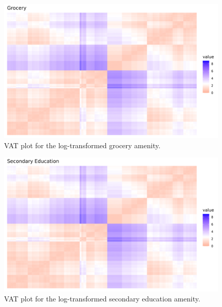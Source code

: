\documentclass[11pt, a4paper]{article}
\begin{document}
{\begin{figure}[H]
\centering
\includegraphics[width=\textwidth]{./vat/grocery_vat_log.png}
\caption[Grocery VAT plot]{VAT plot for the log-transformed grocery amenity.}\label{groceryvat}
\end{figure}








\begin{figure}[H]
\centering
\includegraphics[width=\textwidth]{./vat/secondaryeducation_vat_log.png}
\caption[Secondary education VAT plot]{VAT plot for the log-transformed secondary education amenity.}\label{seceducvat}
\end{figure}








}
\end{document}

